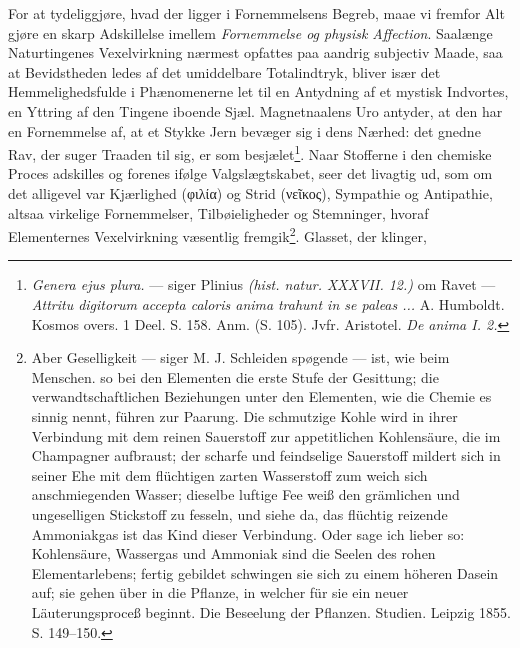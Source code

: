\documentclass[11pt]{book}
\begin{document}
For at tydeliggjøre, hvad der ligger i Fornemmelsens Begreb, maae vi fremfor
Alt gjøre en skarp Adskillelse imellem \emph{Fornemmelse og physisk
Affection}. Saalænge Naturtingenes Vexelvirkning nærmest opfattes paa aandrig
subjectiv Maade, saa at Bevidstheden ledes af det umiddelbare Totalindtryk,
bliver især det Hemmelighedsfulde i Phænomenerne let til en Antydning af et
mystisk Indvortes, en Yttring af den Tingene iboende Sjæl. Magnetnaalens Uro
antyder, at den har en Fornemmelse af, at et Stykke Jern bevæger sig i dens
Nærhed: det gnedne Rav, der suger Traaden til sig, er som
besjælet\footnote{%
\textit{Genera ejus plura.} --- siger Plinius \textit{(hist. natur. XXXVII.
12.)} om Ravet --- \textit{Attritu digitorum} \emph{\textit{accepta caloris
anima}} \textit{trahunt in se paleas ...} A. Humboldt. Kosmos overs. 1 Deel.
S. 158. Anm. (S. 105). Jvfr. Aristotel. \textit{De anima I. 2.}}. Naar
Stofferne i den chemiske Proces adskilles og forenes ifølge Valgslægtskabet,
seer det livagtig ud, som om det alligevel var Kjærlighed (φιλία) og Strid
(νεῖκος), Sympathie og Antipathie, altsaa virkelige Fornemmelser,
Tilbøieligheder og Stemninger, hvoraf Elementernes Vexelvirkning væsentlig
fremgik\footnote{%
Aber Geselligkeit --- siger M. J. Schleiden spøgende --- ist, wie beim
Menschen. so bei den Elementen die erste Stufe der Gesittung;
die verwandtschaftlichen Beziehungen unter den Elementen, wie die Chemie es
sinnig nennt, führen zur Paarung. Die schmutzige Kohle wird in ihrer
Verbindung mit dem reinen Sauerstoff zur appetitlichen Kohlensäure, die im
Champagner aufbraust; der scharfe und feindselige Sauerstoff mildert sich in
seiner Ehe mit dem flüchtigen zarten Wasserstoff zum weich sich
anschmiegenden Wasser; dieselbe luftige Fee weiß den grämlichen und
ungeselligen Stickstoff zu fesseln, und siehe da, das flüchtig reizende
Ammoniakgas ist das Kind dieser Verbindung. Oder sage ich lieber so:
Kohlensäure, Wassergas und Ammoniak sind die Seelen des rohen
Elementarlebens; fertig gebildet schwingen
sie sich zu einem höheren Dasein auf; sie gehen über in die Pflanze, in
welcher für sie ein neuer Läuterungsproceß beginnt. Die Beseelung der
Pflanzen. Studien. Leipzig 1855. S. 149--150.}. Glasset, der klinger,
\end{document}
